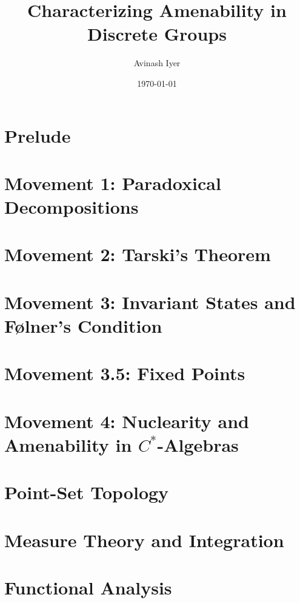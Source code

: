 \documentclass[10pt]{package2}
\title{Characterizing Amenability in Discrete Groups}
\author{Avinash Iyer}
\date{\today}
\newcommand{\1}{\mathds{1}}
\begin{document}
\maketitle
\RaggedRight
\tableofcontents
\chapter{Prelude}
%
\chapter{Movement 1: Paradoxical Decompositions}

\chapter{Movement 2: Tarski's Theorem}

\chapter{Movement 3: Invariant States and Følner's Condition}

\chapter{Movement 3.5: Fixed Points}
\chapter{Movement 4: Nuclearity and Amenability in $C^{\ast}$-Algebras}
\appendix
\chapter{Point-Set Topology}

\chapter{Measure Theory and Integration}

\chapter{Functional Analysis}

\nocite{*}
\printbibliography
\end{document}
